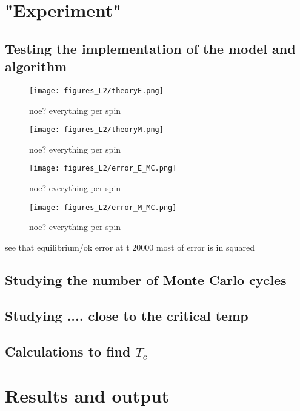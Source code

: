 \documentclass[11pt,a4wide]{article}
\begin{document}
\section{"Experiment"}
\subsection{Testing the implementation of the model and algorithm}



\begin{figure}[htp]
\caption{noe? everything per spin}
\centering
\texttt{[image: figures\_L2/theoryE.png]}
\label{fig:theory E}
\end{figure}

\begin{figure}[htp]
\caption{noe? everything per spin}
\centering
\texttt{[image: figures\_L2/theoryM.png]}
\label{fig:theory M}
\end{figure}


\begin{figure}[htp]
\caption{noe? everything per spin}
\centering
\texttt{[image: figures\_L2/error\_E\_MC.png]}
\label{fig: error E}
\end{figure}

\begin{figure}[htp]
\caption{noe? everything per spin}
\centering
\texttt{[image: figures\_L2/error\_M\_MC.png]}
\label{fig: error M}
\end{figure}

see that equilibrium/ok error at t 20000
most of error is in squared

\subsection{Studying the number of Monte Carlo cycles}


\subsection{Studying .... close to the critical temp}


\subsection{Calculations to find $T_c$}


\section{Results and output}
\end{document}
